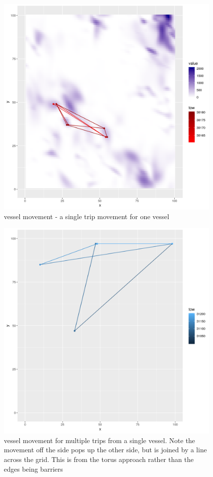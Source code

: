 \documentclass[review]{elsarticle}
\begin{document}
\begin{figure}[!ht]
	\includegraphics[width = \linewidth]{Plots/vessel_move}
	\caption{vessel movement - a single trip movement for one vessel}
	\label{fig:11}
\end{figure}	

\begin{figure}[!ht]
\includegraphics[width = \linewidth]{Plots/vessel_multi_move}
	\caption{vessel movement for multiple trips from a single vessel. Note
	the movement off the side pops up the other side, but is joined by a
	line across the grid. This is from the torus approach rather than the
	edges being barriers}
	\label{fig:12}
\end{figure}	
\end{document}
